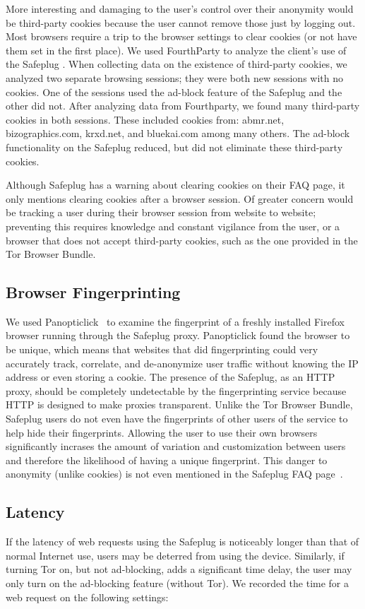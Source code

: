 \documentclass[letterpaper,twocolumn,10pt]{article}
\begin{document}
More interesting and damaging to the user's control over their anonymity would be third-party cookies because the user cannot remove those just by logging out.  Most browsers require a trip to the browser settings to clear cookies (or not have them set in the first place).  We used FourthParty to analyze the client's use of the Safeplug \cite{fourthparty}.  When collecting data on the existence of third-party cookies, we analyzed two separate browsing sessions; they were both new sessions with no cookies.  One of the sessions used the ad-block feature of the Safeplug and the other did not.  After analyzing data from Fourthparty, we found many third-party cookies in both sessions.  These included cookies from: abmr.net, bizographics.com, krxd.net, and bluekai.com among many others.  The ad-block functionality on the Safeplug reduced, but did not eliminate these third-party cookies.

Although Safeplug has a warning about clearing cookies on their FAQ page, it only mentions clearing cookies after a browser session.  Of greater concern would be tracking a user during their browser session from website to website; preventing this requires knowledge and constant vigilance from the user, or a browser that does not accept third-party cookies, such as the one provided in the Tor Browser Bundle.

\subsection{Browser Fingerprinting}
We used Panopticlick~\cite{panopticlick} to examine the fingerprint of a freshly installed Firefox browser running through the Safeplug proxy.  Panopticlick found the browser to be unique, which means that websites that did fingerprinting could very accurately track, correlate, and de-anonymize user traffic without knowing the IP address or even storing a cookie.  The presence of the Safeplug, as an HTTP proxy, should be completely undetectable by the fingerprinting service because HTTP is designed to make proxies transparent.  Unlike the Tor Browser Bundle, Safeplug users do not even have the fingerprints of other users of the service to help hide their fingerprints.  Allowing the user to use their own browsers significantly incrases the amount of variation and customization between users and therefore the likelihood of having a unique fingerprint.  This danger to anonymity (unlike cookies) is not even mentioned in the Safeplug FAQ page~\cite{safeplug}.

\subsection{Latency}
If the latency of web requests using the Safeplug is noticeably longer than that of normal Internet use, users may be deterred from using the device.  Similarly, if turning Tor on, but not ad-blocking, adds a significant time delay, the user may only turn on the ad-blocking feature (without Tor).  We recorded the time for a web request on the following settings:
\end{document}
